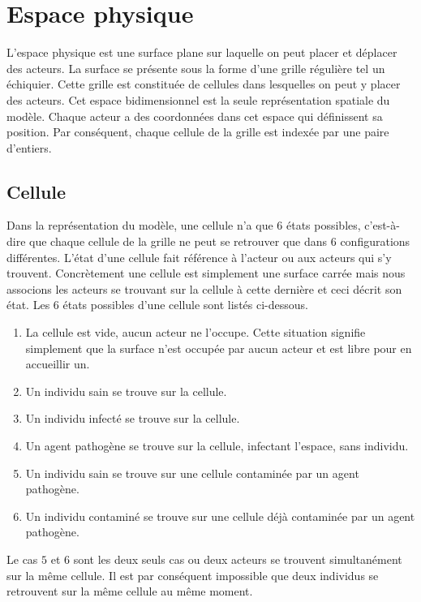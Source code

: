 \section{Espace physique}

L'espace physique est une surface plane sur laquelle on peut placer et déplacer des acteurs. La surface se présente sous la forme d'une grille régulière tel un échiquier. Cette grille est constituée de cellules dans lesquelles on peut y placer des acteurs. Cet espace bidimensionnel est la seule représentation spatiale du modèle. Chaque acteur a des coordonnées dans cet espace qui définissent sa position. Par conséquent, chaque cellule de la grille est indexée par une paire d'entiers.

\subsection{Cellule}

Dans la représentation du modèle, une cellule n'a que $6$ états possibles, c'est-à-dire que chaque cellule de la grille ne peut se retrouver que dans $6$ configurations différentes. L'état d'une cellule fait référence à l'acteur ou aux acteurs qui s'y trouvent. Concrètement une cellule est simplement une surface carrée mais nous associons les acteurs se trouvant sur la cellule à cette dernière et ceci décrit son état. Les $6$ états possibles d'une cellule sont listés ci-dessous.

\begin{enumerate}
	\item La cellule est vide, aucun acteur ne l'occupe. Cette situation signifie simplement que la surface n'est occupée par aucun acteur et est libre pour en accueillir un.
	\item Un individu sain se trouve sur la cellule.
	\item Un individu infecté se trouve sur la cellule.
	\item Un agent pathogène se trouve sur la cellule, infectant l'espace, sans individu.
	\item Un individu sain se trouve sur une cellule contaminée par un agent pathogène.
	\item Un individu contaminé se trouve sur une cellule déjà contaminée par un agent pathogène.
\end{enumerate}

Le cas $5$ et $6$ sont les deux seuls cas ou deux acteurs se trouvent simultanément sur la même cellule. Il est par conséquent impossible que deux individus se retrouvent sur la même cellule au même moment.

